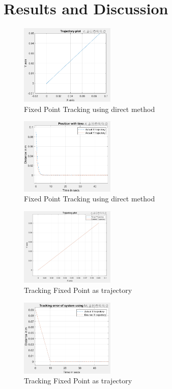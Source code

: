 \documentclass[conference]{IEEEtran}
\begin{document}
\section{Results and Discussion}
\begin{figure}[htbp]
\centerline{\includegraphics[width=0.4\textwidth]{FPTPID2.png}}
\caption{Fixed Point Tracking using direct method}
\label{fig4}
\end{figure}
\begin{figure}[htbp]
\centerline{\includegraphics[width=0.4\textwidth]{FPTEPID2.png}}
\caption{Fixed Point Tracking using direct method}
\label{fig5}
\end{figure}
\begin{figure}[htbp]
\centerline{\includegraphics[width=0.4\textwidth]{FPTPID.png}}
\caption{Tracking Fixed Point as trajectory}
\label{fig6}
\end{figure}
\begin{figure}[htbp]
\centerline{\includegraphics[width=0.4\textwidth]{FPTEPID.png}}
\caption{Tracking Fixed Point as trajectory}
\label{fig7}
\end{figure}
\end{document}
